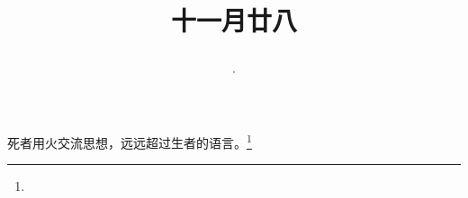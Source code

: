 \title{\date[d=9,m=1,y=2024][year:cn-y,年,month:cn,day:cn,日,·,weekday]·十一月廿八 }
死者用火交流思想，远远超过生者的语言。\footnote{ }


